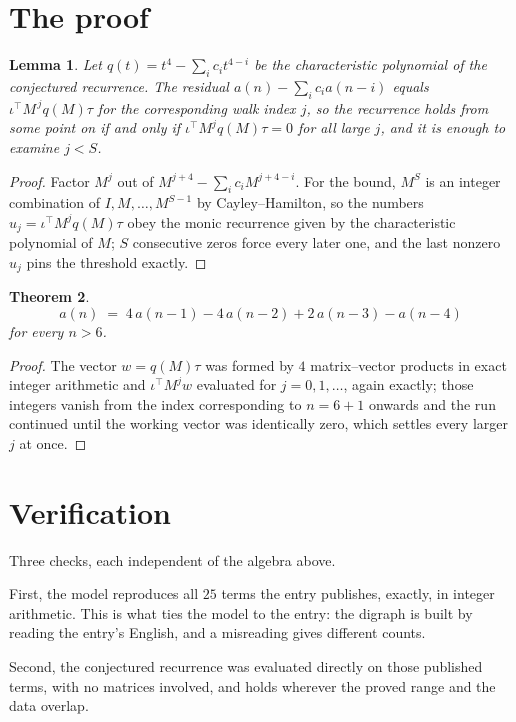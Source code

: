 \documentclass[11pt,a4paper]{article}
\theoremstyle{plain}
\newtheorem{theorem}{Theorem}
\newtheorem{lemma}[theorem]{Lemma}
\theoremstyle{definition}
\begin{document}
\section{The proof}

\begin{lemma}\label{lem:crit}
Let $q(t)=t^{4}-\sum_i c_it^{4-i}$ be the characteristic polynomial of the
conjectured recurrence. The residual $a(n)-\sum_ic_ia(n-i)$ equals
$\iota^{\!\top}M^{\,j}q(M)\tau$ for the corresponding walk index $j$, so the recurrence
holds from some point on if and only if $\iota^{\!\top}M^{j}q(M)\tau=0$ for all large $j$,
and it is enough to examine $j<S$.
\end{lemma}

\begin{proof}
Factor $M^{j}$ out of $M^{j+4}-\sum_ic_iM^{j+4-i}$. For the bound, $M^{S}$
is an integer combination of $I,M,\dots,M^{S-1}$ by Cayley--Hamilton, so the numbers
$u_j=\iota^{\!\top}M^{j}q(M)\tau$ obey the monic recurrence given by the characteristic
polynomial of $M$; $S$ consecutive zeros force every later one, and the last nonzero $u_j$
pins the threshold exactly.
\end{proof}

\begin{theorem}
\[
a(n)\;=\;4\,a(n-1) - 4\,a(n-2) + 2\,a(n-3) - a(n-4)
\]
for every $n>6$.
\end{theorem}

\begin{proof}
The vector $w=q(M)\tau$ was formed by $4$ matrix--vector products in exact integer
arithmetic and $\iota^{\!\top}M^{j}w$ evaluated for $j=0,1,\dots$, again exactly; those
integers vanish from the index corresponding to $n=6+1$ onwards and the run continued
until the working vector was identically zero, which settles every larger $j$ at once.
\end{proof}

\section{Verification}

Three checks, each independent of the algebra above.

First, the model reproduces all $25$ terms the entry publishes, exactly, in integer
arithmetic. This is what ties the model to the entry: the digraph is built by reading the
entry's English, and a misreading gives different counts.

Second, the conjectured recurrence was evaluated directly on those published terms, with no
matrices involved, and holds wherever the proved range and the data overlap.
\end{document}
